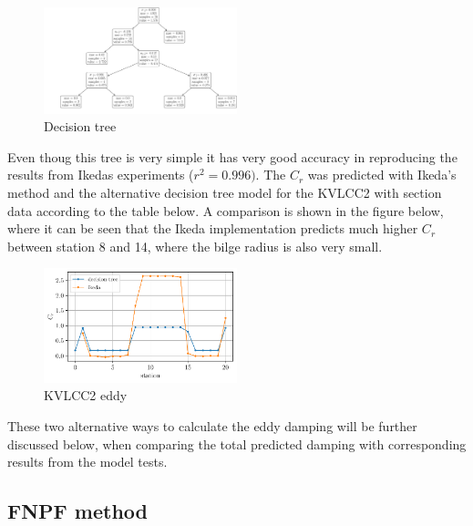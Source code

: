     \begin{figure}[H]
        \begin{center}\includegraphics[width = 0.5\textwidth]{figures/decision_tree.pdf}\end{center}
        \vspace{-1cm}
        \caption{Decision tree}
        \label{fig:decision_tree}
    \end{figure}
    
    Even thoug this tree is very simple it has very good accuracy in
reproducing the results from Ikedas experiments ($r^2=0.996)$. The
$C_r$ was predicted with Ikeda's method and the alternative decision
tree model for the KVLCC2 with section data according to the table
below. A comparison is shown in the figure below, where it can be seen
that the Ikeda implementation predicts much higher $C_r$ between
station 8 and 14, where the bilge radius is also very small.

    \begin{figure}[H]
        \begin{center}\includegraphics[width = 0.5\textwidth]{figures/kvlcc2_eddy.pdf}\end{center}
        \vspace{-1cm}
        \caption{KVLCC2 eddy}
        \label{fig:kvlcc2_eddy}
    \end{figure}
    
    These two alternative ways to calculate the eddy damping will be further
discussed below, when comparing the total predicted damping with
corresponding results from the model tests.

    \subsection{FNPF method}\label{fnpf-method}

